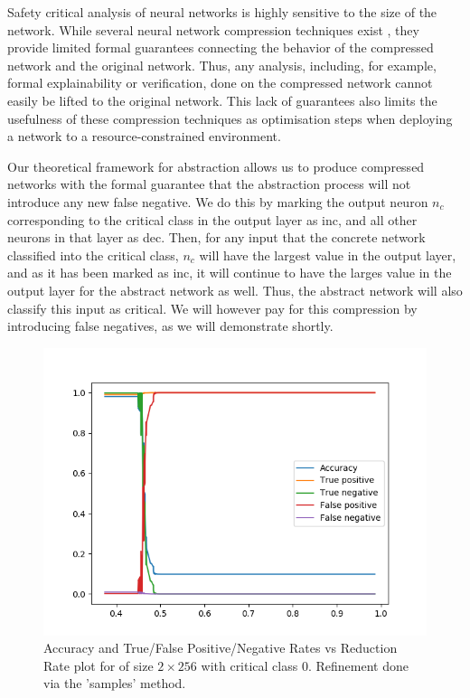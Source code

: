 Safety critical analysis of neural networks is highly sensitive to the size of
the network. While several neural network compression techniques exist
, they provide limited formal guarantees  connecting the behavior
of the compressed network and the original network. Thus, any analysis,
including, for example, formal explainability or verification, done on the
compressed network cannot easily be lifted to the original network. This lack of
guarantees also limits the usefulness of these compression techniques as
optimisation steps when deploying a network to a resource-constrained
environment. 

Our theoretical framework for abstraction allows us to produce compressed
networks with the formal guarantee that the abstraction process will not
introduce any new false negative. We do this by marking the output neuron $n_c$
corresponding to the critical class in the output layer as inc, and all other
neurons in that layer as dec.  Then, for any input that the concrete network
classified into the critical class, $n_c$ will have the largest value in the
output layer, and as it has been marked as inc, it will continue to have the
larges value in the output layer for the abstract network as well. Thus, the
abstract network will also classify this input as critical. We will however pay
for this compression by introducing false negatives, as we will demonstrate
shortly. 

\begin{figure}
    \includegraphics[scale=0.6]{figs/mnist_2_256_class_samples.png}
    \caption{Accuracy and True/False Positive/Negative Rates vs Reduction Rate
        plot for \mnist of size $2 \times 256$ with critical class 0. Refinement
        done via the 'samples' method.}
    \label{f:mnist-class-samples}
\end{figure}

